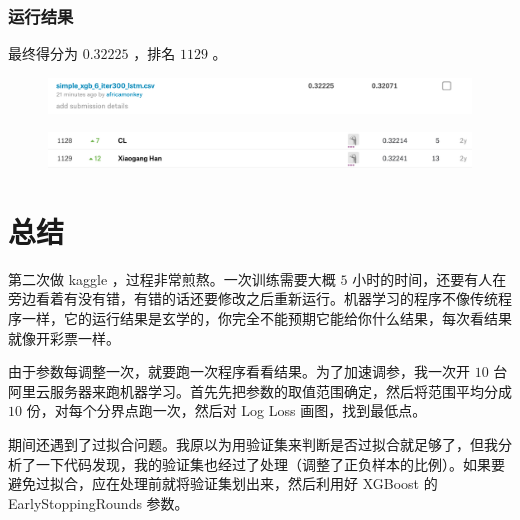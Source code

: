 \documentclass{article}
\begin{document}
\subsubsection{运行结果}

最终得分为 $0.32225$ ，排名 $1129$ 。

\begin{figure}[!h]
\centering
\includegraphics[scale=0.4]{tu15.png}
\end{figure}

\begin{figure}[!h]
\centering
\includegraphics[scale=0.4]{tu16.png}
\end{figure}

\section{总结}

第二次做 kaggle ，过程非常煎熬。一次训练需要大概 $5$ 小时的时间，还要有人在旁边看着有没有错，有错的话还要修改之后重新运行。机器学习的程序不像传统程序一样，它的运行结果是玄学的，你完全不能预期它能给你什么结果，每次看结果就像开彩票一样。

由于参数每调整一次，就要跑一次程序看看结果。为了加速调参，我一次开 $10$ 台阿里云服务器来跑机器学习。首先先把参数的取值范围确定，然后将范围平均分成 $10$ 份，对每个分界点跑一次，然后对 Log Loss 画图，找到最低点。

期间还遇到了过拟合问题。我原以为用验证集来判断是否过拟合就足够了，但我分析了一下代码发现，我的验证集也经过了处理（调整了正负样本的比例）。如果要避免过拟合，应在处理前就将验证集划出来，然后利用好 XGBoost 的 EarlyStoppingRounds 参数。
\end{document}
